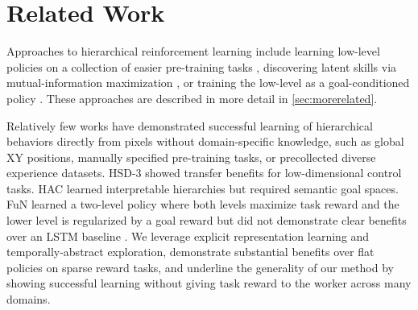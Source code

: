 \vspace*{-3ex}
\section{Related Work}
\label{sec:related}
\vspace*{-1.5ex}

Approaches to hierarchical reinforcement learning include learning low-level policies on a collection of easier pre-training tasks \citep{heess2016modulated,tessler2017dsn,frans2017mlsh,rao2021helms,veeriah2021modac}, discovering latent skills via mutual-information maximization \citep{gregor2016vic,florensa2017snn,hausman2018skills,eysenbach2018diayn,achiam2018valor,merel2018humanoid,laskin2022cic,sharma2019dads,xie2020lsp,hafner2020apd,strouse2021disdain}, or training the low-level as a goal-conditioned policy \citep{andrychowicz2017her,levy2017hac,nachum2018hiro,nachum2018norl,co2018sectar,warde2018discern,nair2018rig,pong2019skewfit,hartikainen2019ddl,gehring2021hsd3,shah2021recon}. 
These approaches are described in more detail in \cref{sec:morerelated}.

Relatively few works have demonstrated successful learning of hierarchical behaviors directly from pixels without domain-specific knowledge, such as global XY positions, manually specified pre-training tasks, or precollected diverse experience datasets.
HSD-3 \citep{gehring2021hsd3} showed transfer benefits for low-dimensional control tasks. 
HAC \citep{levy2017hac} learned interpretable hierarchies but required semantic goal spaces. 
FuN \citep{vezhnevets2017fun} learned a two-level policy where both levels maximize task reward and the lower level is regularized by a goal reward but did not demonstrate clear benefits over an LSTM baseline \citep{hochreiter1997lstm}. 
We leverage explicit representation learning and temporally-abstract exploration, demonstrate substantial benefits over flat policies on sparse reward tasks, and underline the generality of our method by showing successful learning without giving task reward to the worker across many domains.
